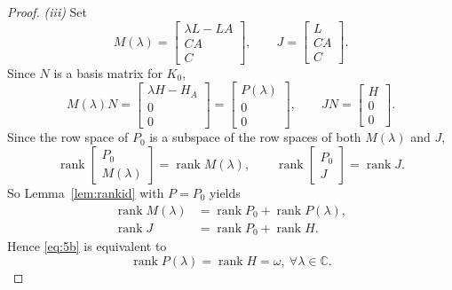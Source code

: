 \documentclass[journal]{IEEEtran}
\theoremstyle{plainn}
\theoremstyle{remark}
\begin{document}
\begin{proof}
\emph{(iii)} Set
\begin{equation*}
M(\lambda)=\begin{bmatrix}
	\lambda L-LA\\CA\\C
\end{bmatrix},\qquad J=\begin{bmatrix}
L \\ CA \\C
\end{bmatrix}.
\end{equation*}
Since $N$ is a basis matrix for $K_0$,
\begin{equation*}
M(\lambda)N=\begin{bmatrix}
	\lambda H-H_A \\ 0 \\ 0
\end{bmatrix}=\begin{bmatrix}
P(\lambda) \\ 0 \\ 0
\end{bmatrix},\qquad JN=\begin{bmatrix}
H \\ 0 \\ 0
\end{bmatrix} .
\end{equation*}
Since the row space of $P_0$ is a subspace of the row spaces of both $M(\lambda)$ and $J$,
\begin{equation*}
\operatorname{rank}\begin{bmatrix}P_0\\ M(\lambda)\end{bmatrix}=\operatorname{rank}M(\lambda),
\qquad
\operatorname{rank}\begin{bmatrix}P_0\\ J\end{bmatrix}=\operatorname{rank}J .
\end{equation*}
So Lemma~\ref{lem:rankid} with $P=P_0$ yields
\begin{equation*}
\begin{aligned}
\operatorname{rank}M(\lambda)&=\operatorname{rank}P_0+\operatorname{rank}P(\lambda),\\
\operatorname{rank}J&=\operatorname{rank}P_0+\operatorname{rank}H .
\end{aligned}
\end{equation*}
Hence \eqref{eq:5b} is equivalent to
\begin{equation}\label{eq:5b-1}
\operatorname{rank}P(\lambda)=\operatorname{rank}H=\omega,\ \forall \lambda\in\mathbb C.

\end{equation}
\end{proof}
\end{document}

